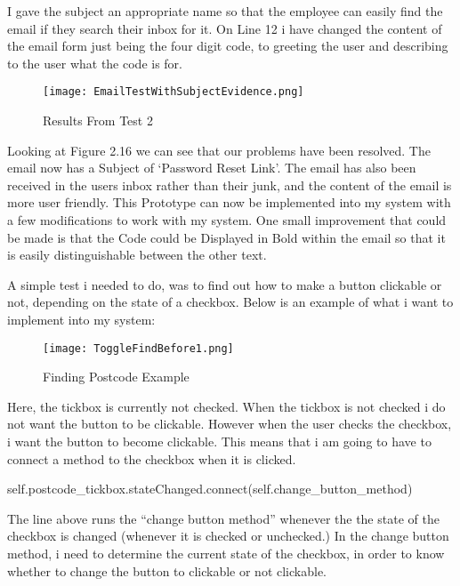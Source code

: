 I gave the subject an appropriate name so that the employee can easily find the email if they search their inbox for it. On Line 12 i have changed the content of the email form just being the four digit code, to greeting the user and describing to the user what the code is for. \par

\begin{figure}[H]
\caption{Results From Test 2} \label{fig:Results From Test 2}
\hfill\texttt{[image: EmailTestWithSubjectEvidence.png]}\hspace*{\fill}
\end{figure}

Looking at Figure 2.16 we can see that our problems have been resolved. The email now has a Subject of `Password Reset Link'. The email has also been received in the users inbox rather than their junk, and the content of the email is more user friendly. This Prototype can now be implemented into my system with a few modifications to work with my system. One small improvement that could be made is that the Code could be Displayed in Bold within the email so that it is easily distinguishable between the other text. \par
\pagebreak


A simple test i needed to do, was to find out how to make a button clickable or not, depending on the state of a checkbox. Below is an example of what i want to implement into my system:

\begin{figure}[H]
\caption{Finding Postcode Example} \label{fig:Finding Postcode Example}
\hfill\texttt{[image: ToggleFindBefore1.png]}\hspace*{\fill}
\end{figure}

Here, the tickbox is currently not checked. When the tickbox is not checked i do not want the button to be clickable. However when the user checks the checkbox, i want the button to become clickable. This means that i am going to have to connect a method to the checkbox when it is clicked.
\begin{python}
self.postcode_tickbox.stateChanged.connect(self.change_button_method)
\end{python}

The line above runs the ``change button method'' whenever the the state of the checkbox is changed (whenever it is checked or unchecked.) In the change button method, i need to determine the current state of the checkbox, in order to know whether to change the button to clickable or not clickable.

